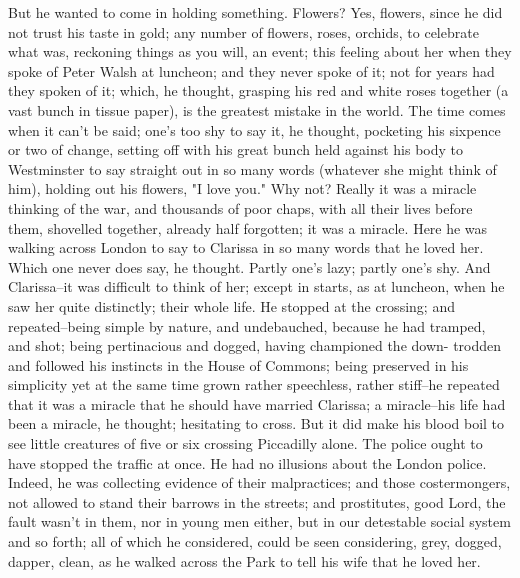 \documentclass[lang=cn,10pt]{elegantbook}
\begin{document}
But he wanted to come in holding something.  Flowers?  Yes,
flowers, since he did not trust his taste in gold; any number of
flowers, roses, orchids, to celebrate what was, reckoning things as
you will, an event; this feeling about her when they spoke of Peter
Walsh at luncheon; and they never spoke of it; not for years had
they spoken of it; which, he thought, grasping his red and white
roses together (a vast bunch in tissue paper), is the greatest
mistake in the world.  The time comes when it can't be said; one's
too shy to say it, he thought, pocketing his sixpence or two of
change, setting off with his great bunch held against his body to
Westminster to say straight out in so many words (whatever she
might think of him), holding out his flowers, "I love you."  Why
not?  Really it was a miracle thinking of the war, and thousands of
poor chaps, with all their lives before them, shovelled together,
already half forgotten; it was a miracle.  Here he was walking
across London to say to Clarissa in so many words that he loved
her.  Which one never does say, he thought.  Partly one's lazy;
partly one's shy.  And Clarissa--it was difficult to think of her;
except in starts, as at luncheon, when he saw her quite distinctly;
their whole life.  He stopped at the crossing; and repeated--being
simple by nature, and undebauched, because he had tramped, and
shot; being pertinacious and dogged, having championed the down-
trodden and followed his instincts in the House of Commons; being
preserved in his simplicity yet at the same time grown rather
speechless, rather stiff--he repeated that it was a miracle that he
should have married Clarissa; a miracle--his life had been a
miracle, he thought; hesitating to cross.  But it did make his
blood boil to see little creatures of five or six crossing
Piccadilly alone.  The police ought to have stopped the traffic at
once.  He had no illusions about the London police.  Indeed, he was
collecting evidence of their malpractices; and those costermongers,
not allowed to stand their barrows in the streets; and prostitutes,
good Lord, the fault wasn't in them, nor in young men either, but
in our detestable social system and so forth; all of which he
considered, could be seen considering, grey, dogged, dapper, clean,
as he walked across the Park to tell his wife that he loved her.
\end{document}
